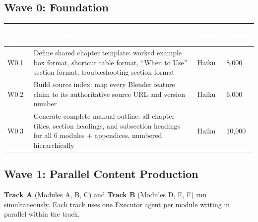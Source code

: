 \documentclass[11pt,letterpaper]{article}
\newcommand{\tableheader}[1]{\textbf{\sffamily\textcolor{white}{#1}}}
\begin{document}
\subsection{Wave 0: Foundation}

\begin{center}
\begin{tabularx}{\textwidth}{L{2.5cm}XC{2cm}C{2cm}}
\toprule
{}
\tableheader{Task ID} & \tableheader{Description} & \tableheader{Model} & \tableheader{Tokens} \\
\midrule
W0.1 & Define shared chapter template: worked example box format, shortcut table format, ``When to Use'' section format, troubleshooting section format & Haiku & 8,000 \\
W0.2 & Build source index: map every Blender feature claim to its authoritative source URL and version number & Haiku & 6,000 \\
W0.3 & Generate complete manual outline: all chapter titles, section headings, and subsection headings for all 6 modules + appendices, numbered hierarchically & Haiku & 10,000 \\
\bottomrule
\end{tabularx}
\end{center}

\subsection{Wave 1: Parallel Content Production}

\textbf{Track A} (Modules A, B, C) and \textbf{Track B} (Modules D, E, F) run simultaneously. Each track uses one Executor agent per module writing in parallel within the track.
\end{document}
